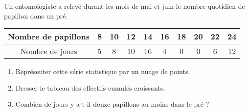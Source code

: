 
Un entomologiste a relevé durant les mois de mai et juin le nombre quotidien de papillon dans un pré.

\begin{tabular}{|c|c|c|c|c|c|c|c|c|c|}
\hline 
Nombre de papillons &8 &10 &12 &14 &16& 18 &20& 22 &24\\
\hline 
Nombre de jours &5& 8 &10& 16& 4& 0& 0& 6& 12\\
\hline 
\end{tabular} 

\begin{enumerate}
\item Représenter cette série statistique par un nuage de points.
\item  Dresser le tableau des effectifs cumulés croissants.
\item  Combien de jours y a-t-il douze papillons au moins dans le pré ?
\end{enumerate}
